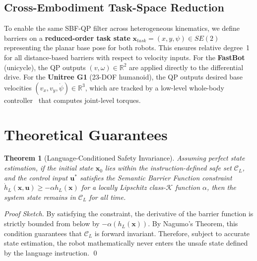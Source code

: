 \documentclass[conference]{IEEEtran}
\newtheorem{theorem}{Theorem}
\begin{document}
\subsection{Cross-Embodiment Task-Space Reduction}
To enable the same SBF-QP filter across heterogeneous kinematics, we define barriers on a \textbf{reduced-order task state} $\mathbf{x}_{task} = (x, y, \psi) \in SE(2)$ representing the planar base pose for both robots. This ensures relative degree~1 for all distance-based barriers with respect to velocity inputs. For the \textbf{FastBot} (unicycle), the QP outputs $(v, \omega) \in \mathbb{R}^2$ are applied directly to the differential drive. For the \textbf{Unitree G1} (23-DOF humanoid), the QP outputs desired base velocities $(v_x, v_y, \dot{\psi}) \in \mathbb{R}^3$, which are tracked by a low-level whole-body controller~\cite{margolis2022walkthesewaysim} that computes joint-level torques.

\section{Theoretical Guarantees}

\begin{theorem}[Language-Conditioned Safety Invariance]
\label{thm:invariance}
Assuming perfect state estimation, if the initial state $\mathbf{x}_0$ lies within the instruction-defined safe set $\mathcal{C}_L$, and the control input $\mathbf{u}^*$ satisfies the Semantic Barrier Function constraint $\dot{h}_L(\mathbf{x}, \mathbf{u}) \ge -\alpha h_L(\mathbf{x})$ for a locally Lipschitz class-$\mathcal{K}$ function $\alpha$, then the system state remains in $\mathcal{C}_L$ for all time.
\end{theorem}
\begin{proof}[Proof Sketch]
By satisfying the constraint, the derivative of the barrier function is strictly bounded from below by $-\alpha(h_L(\mathbf{x}))$. By Nagumo's Theorem, this condition guarantees that $\mathcal{C}_L$ is forward invariant. Therefore, subject to accurate state estimation, the robot mathematically never enters the unsafe state defined by the language instruction. \qed
\end{proof}
\end{document}
